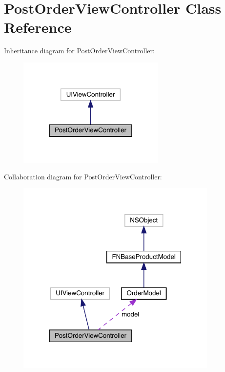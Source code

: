 \hypertarget{interface_post_order_view_controller}{}\section{Post\+Order\+View\+Controller Class Reference}
\label{interface_post_order_view_controller}


Inheritance diagram for Post\+Order\+View\+Controller\+:\nopagebreak
\begin{figure}[H]
\begin{center}
\leavevmode
\includegraphics[width=206pt]{interface_post_order_view_controller__inherit__graph}
\end{center}
\end{figure}


Collaboration diagram for Post\+Order\+View\+Controller\+:\nopagebreak
\begin{figure}[H]
\begin{center}
\leavevmode
\includegraphics[width=282pt]{interface_post_order_view_controller__coll__graph}
\end{center}
\end{figure}
